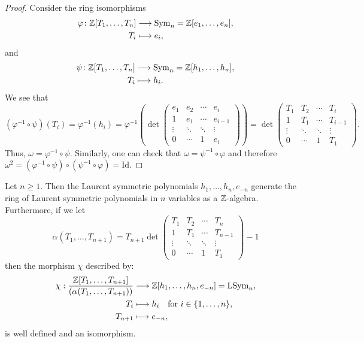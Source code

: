 \documentclass[11pt]{amsart}
\begin{document}
\begin{proof}
    Consider the ring isomorphisms
    \begin{align*}
        \varphi \colon \mathbb{Z}[T_1,\dots,T_n] &\longrightarrow \mathrm{Sym}_n = \mathbb{Z}[e_1,\dots,e_n], \\
        T_i &\longmapsto e_i,
    \end{align*}
    and
    \begin{align*}
        \psi \colon \mathbb{Z}[T_1,\dots,T_n] &\longrightarrow \mathrm{Sym}_n = \mathbb{Z} [h_1,\dots,h_n], \\
        T_i &\longmapsto h_i.
    \end{align*}
    We see that
    \[
    (\varphi^{-1} \circ \psi) (T_i) = \varphi^{-1} (h_i) =\varphi^{-1} \left( \det\begin{pmatrix}
        e_1 & e_2 & \cdots & e_i\\
        1 & e_1 & \cdots  & e_{i -1}\\
        \vdots & \ddots & \ddots & \vdots\\
        0 & \cdots & 1 & e_1
        \end{pmatrix}
        \right) = \det \begin{pmatrix}
        T_1 & T_2 & \cdots & T_i\\
        1 & T_1 & \cdots  & T_{i -1}\\
        \vdots & \ddots & \ddots & \vdots\\
        0 & \cdots & 1 & T_1
    \end{pmatrix}.
    \]
    Thus, \(\omega = \varphi^{-1} \circ \psi\). Similarly, one can check that \(\omega = \psi^{-1} \circ \varphi\) and therefore \(\omega^2 = (\varphi^{-1} \circ \psi) \circ (\psi^{-1} \circ \varphi) = \mathrm{Id}\).
\end{proof}

\begin{prop}\label{prop:hgen}
    Let \(n \geq 1\).  Then the Laurent symmetric polynomials \(h_1,\dots,h_n,e_{-n}\) generate the ring of Laurent symmetric polynomials in \(n\) variables as a $\mathbb{Z}$-algebra. 
    Furthermore, if we let 
    \[
    \alpha(T_1,\dots,T_{n +1}) = T_{n+ 1}\det 
    \begin{pmatrix}
        T_1 & T_2 & \cdots & T_n\\
        1 & T_1 & \cdots  & T_{n -1}\\
        \vdots & \ddots & \ddots & \vdots\\
        0 & \cdots & 1 & T_1
    \end{pmatrix} - 1
    \]
     then the morphism $\chi$ described by:
    \begin{align*}
       \chi :\frac{\mathbb{Z}[T_1,\dots,T_{n + 1}]}{(\alpha (T_1,\dots,T_{n+ 1}))}&\longrightarrow \mathbb{Z}[h_1,\dots, h_n, e_{-n}] = \mathrm{LSym}_n, \\
        T_i &\longmapsto h_i \quad \text{for }i \in \{ 1,\dots,n\}, \\
        T_{n+1} &\longmapsto e_{-n},
    \end{align*}
    is well defined and an isomorphism.
\end{prop}
\end{document}
